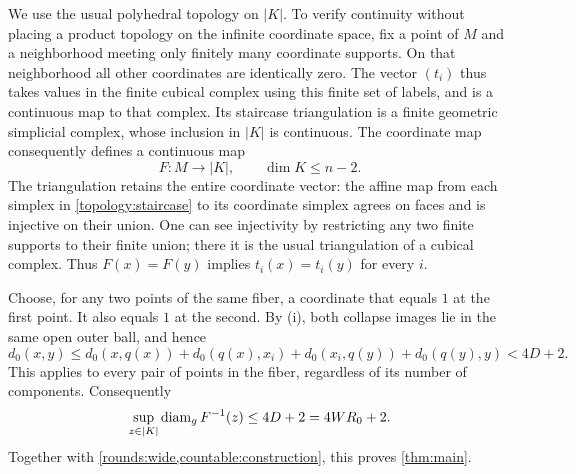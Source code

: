 We use the usual polyhedral topology on $|K|$.  To verify continuity
without placing a product topology on the infinite coordinate space,
fix a point of $M$ and a neighborhood meeting only finitely many
coordinate supports.  On that neighborhood all other coordinates
are identically zero.  The vector $(t_i)$ thus takes values in the
finite cubical complex using this finite set of labels, and is a
continuous map to that complex.  Its staircase triangulation is a
finite geometric simplicial complex, whose inclusion in $|K|$ is
continuous.  The coordinate map consequently defines a continuous map
\begin{equation}\label{topology:final-map}
 F:M\longrightarrow |K|,\qquad \dim K\le n-2.
\end{equation}
The triangulation retains the entire coordinate vector: the affine
map from each simplex in \eqref{topology:staircase} to its coordinate
simplex agrees on faces and is injective on their union.  One can see
injectivity by restricting any two finite supports to their finite
union; there it is the usual triangulation of a cubical complex.
Thus $F(x)=F(y)$ implies $t_i(x)=t_i(y)$ for every $i$.

Choose, for any two points of the same fiber, a coordinate that equals
$1$ at the first point.  It also equals $1$ at the second.  By (i), both
collapse images lie in the same open outer ball, and hence
\[
 d_0(x,y)
 \le d_0(x,q(x))+d_0(q(x),x_i)
       +d_0(x_i,q(y))+d_0(q(y),y)
 <4D+2.
\]
This applies to every pair of points in the fiber, regardless of its
number of components.  Consequently
\begin{equation}\label{topology:fiber-bound}
 \sup_{z\in|K|}\operatorname{diam}_{g}F^{-1}(z)\le4D+2=4WR_0+2.
\end{equation}
Together with \cref{rounds:wide,countable:construction}, this proves
\cref{thm:main}.

